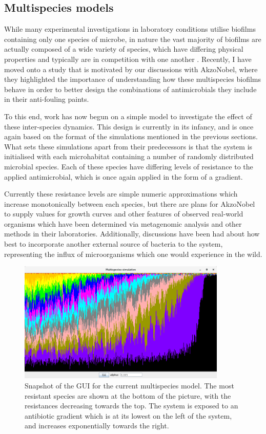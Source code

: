 \documentclass[a4paper,12pt]{article}
\begin{document}
\subsection{Multispecies models}

While many experimental investigations in laboratory conditions utilise biofilms containing only one species of microbe, in nature the vast majority of biofilms are actually composed 
of a wide variety of species, which have differing physical properties and typically are in competition with one another \cite{bioref:Elias-biofilm-multispecies-2012}.  Recently, I have 
moved onto a study that is motivated by our discussions with AkzoNobel, where they highlighted the importance of understanding how these multispecies biofilms behave in order to better 
design the combinations of antimicrobials they include in their anti-fouling paints.

To this end, work has now begun on a simple model to investigate the effect of these inter-species dynamics.  This design is 
currently in its infancy, and is once again based on the format of the simulations mentioned in the previous sections.  What sets these simulations apart from their predecessors is that 
the system is initialised with each microhabitat containing a number of randomly distributed microbial species.  Each of these species have differing levels of resistance to the applied 
antimicrobial, which is once again applied in the form of a gradient.  

Currently these resistance levels are simple numeric approximations which increase monotonically between each 
species, but there are plans for AkzoNobel to supply values for growth curves and other features of observed real-world organisms which have been determined via metagenomic analysis 
and other methods in their laboratories.  Additionally, discussions have been had about how best to incorporate another external source of bacteria to the system, 
representing the influx of microorganisms which one would experience in the wild.

\begin{figure}[H]
 \centering
 \includegraphics[height=5.8cm]{multispecies-snapshot}
 \caption{Snapshot of the GUI for the current multispecies model.  The most resistant species are shown at the bottom of the picture, with the resistances decreasing towards the top.  
 The system is exposed to an antibiotic gradient which is at its lowest on the left of the system, and increases exponentially towards the right.}
 \label{fig:multispecies-snapshot}
\end{figure}
\end{document}
